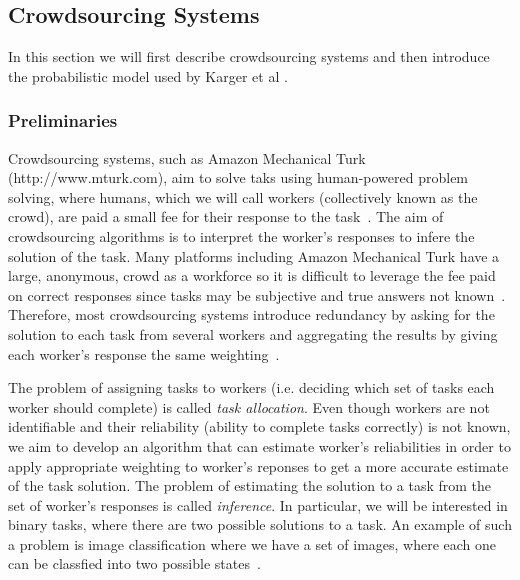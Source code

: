 \documentclass[12pt]{article}
\numberwithin{equation}{section}
\begin{document}
\subsection{Crowdsourcing Systems}
\label{sec:background;subsec:crowdsourcingSystems}

In this section we will first describe crowdsourcing systems and then introduce the probabilistic model used by Karger et al \cite{KOS13}.

\subsubsection{Preliminaries}
\label{sec:background;subsec:crowdsourcingSystems;subsubsec:preliminaries}

Crowdsourcing systems, such as Amazon Mechanical Turk (http://www.mturk.com), aim to solve taks using human-powered problem solving, where humans, which we will call workers (collectively known as the crowd), are paid a small fee for their response to the task~\cite{KOS13,EHR12}. The aim of crowdsourcing algorithms is to interpret the worker's responses to infere the solution of the task. Many platforms including Amazon Mechanical Turk have a large, anonymous, crowd as a workforce so it is difficult to leverage the fee paid on correct responses since tasks may be subjective and true answers not known~\cite{KOS13}. Therefore, most crowdsourcing systems introduce redundancy by asking for the solution to each task from several workers and aggregating the results by giving each worker's response the same weighting~\cite{KOS13}.

The problem of assigning tasks to workers (i.e. deciding which set of tasks each worker should complete) is called \textsl{task allocation}. Even though workers are not identifiable and their reliability (ability to complete tasks correctly) is not known, we aim to develop an algorithm that can estimate worker's reliabilities in order to apply appropriate weighting to worker's reponses to get a more accurate estimate of the task solution. The problem of estimating the solution to a task from the set of worker's responses is called \textsl{inference}. In particular, we will be interested in binary tasks, where there are two possible solutions to a task. An example of such a problem is image classification where we have a set of images, where each one can be classfied into two possible states~\cite{KOS13}.
\end{document}
